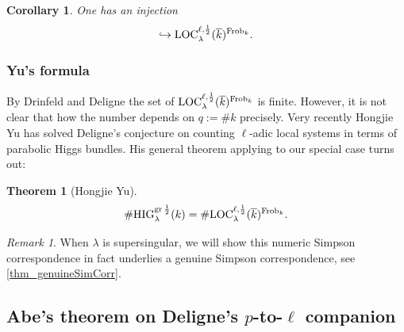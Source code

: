 \documentclass[12pt,twoside]{book}
\theoremstyle{plain}
\newtheorem{theorem}{Theorem}[section]
\newtheorem{corollary}[corollary]{Corollary}
\theoremstyle{definition}
\theoremstyle{remark}
\newtheorem{remark}[remark]{Remark}
\numberwithin{equation}{section}
\def\High{{\mathrm{HIG}^{{\rm gr}\,{1\over 2}}_{\lambda}}}
\def\Loch{{\mathrm{LOC}^{\ell,{1\over 2}}_{\lambda}}}
\def\Frob{\mathrm{Frob}}
\begin{document}
\begin{corollary} \label{mthm_LocSys_equivRelation}
One has an injection
\begin{equation*}
[\Loch(k)] \hookrightarrow \Loch(\overline{k})^{\Frob_k}.
\end{equation*}
\end{corollary}

\subsubsection{Yu's formula}
By Drinfeld and Deligne the set of $\Loch(\overline{k})^{\Frob_k}$ is finite. However, it is not clear that how the number depends on $q:=\#k$ precisely. Very recently Hongjie Yu \cite{Yu23} has solved Deligne's conjecture on counting $\ell$-adic local systems in terms of parabolic Higgs bundles. His general theorem applying to our special case turns out:
\begin{theorem}[Hongjie Yu{\cite{Yu23}}] \label{thm_Yu}
\[\#\High (k) = \# \Loch(\overline{k})^{\Frob_k}.\]
\end{theorem}
\begin{remark}
When $\lambda$ is supersingular, we will show this numeric Simpson correspondence in fact underlies a genuine Simpson correspondence, see \autoref{thm_genuineSimCorr}.
\end{remark}

\newpage

\subsection{Abe's theorem on Deligne's $p$-to-$\ell$ companion}
\end{document}
